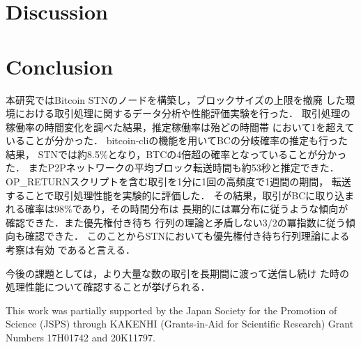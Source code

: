 \documentclass[graybox]{svmult}
\begin{document}
\section{Discussion}
\label{sec:discussion}



\section{Conclusion}
\label{sec:conclusion}


本研究ではBitcoin STNのノードを構築し，ブロックサイズの上限を撤廃
した環境における取引処理に関するデータ分析や性能評価実験を行った．
取引処理の稼働率の時間変化を調べた結果，推定稼働率は殆どの時間帯
において1を超えていることが分かった．
bitcoin-cliの機能を用いてBCの分岐確率の推定も行った結果，
STNでは約8.5\%となり，BTCの4倍超の確率となっていることが分かった．
またP2Pネットワークの平均ブロック転送時間も約53秒と推定できた．
OP\_RETURNスクリプトを含む取引を1分に1回の高頻度で1週間の期間，
転送することで取引処理性能を実験的に評価した．
その結果，取引がBCに取り込まれる確率は98\%であり，その時間分布は
長期的には冪分布に従うような傾向が確認できた．また優先権付き待ち
行列の理論と矛盾しない3/2の冪指数に従う傾向も確認できた．
このことからSTNにおいても優先権付き待ち行列理論による考察は有効
であると言える．

今後の課題としては，より大量な数の取引を長期間に渡って送信し続け
た時の処理性能について確認することが挙げられる．




\begin{acknowledgement}
 This work was partially supported by the Japan Society for the Promotion of 
Science (JSPS) through KAKENHI (Grants-in-Aid for Scientific Research) Grant 
Numbers 17H01742 and 20K11797. 
\end{acknowledgement}



%
\end{document}
